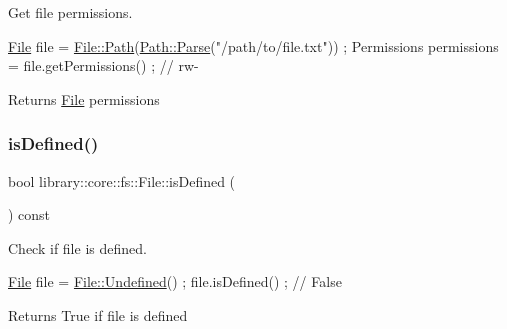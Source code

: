 Get file permissions. 


\begin{DoxyCode}
\hyperlink{classlibrary_1_1core_1_1fs_1_1File_a7490060f19a21d4ee58bb6cec87a1ca6}{File} file = \hyperlink{classlibrary_1_1core_1_1fs_1_1File_a0e0d8a8becb3cdd21775554e181452d8}{File::Path}(\hyperlink{classlibrary_1_1core_1_1fs_1_1Path_aebf5bd3af83e0b7376616e146f3e55df}{Path::Parse}(\textcolor{stringliteral}{"/path/to/file.txt"})) ;
Permissions permissions = file.getPermissions() ; \textcolor{comment}{// rw-}
\end{DoxyCode}


\begin{DoxyReturn}{Returns}
\hyperlink{classlibrary_1_1core_1_1fs_1_1File}{File} permissions 
\end{DoxyReturn}
\mbox{\label{classlibrary_1_1core_1_1fs_1_1File_a2044eecd956aaf55b4c55872485e1bf9}} 
\subsubsection{\texorpdfstring{is\+Defined()}{isDefined()}}
{\footnotesize\ttfamily bool library\+::core\+::fs\+::\+File\+::is\+Defined (\begin{DoxyParamCaption}{ }\end{DoxyParamCaption}) const}



Check if file is defined. 


\begin{DoxyCode}
\hyperlink{classlibrary_1_1core_1_1fs_1_1File_a7490060f19a21d4ee58bb6cec87a1ca6}{File} file = \hyperlink{classlibrary_1_1core_1_1fs_1_1File_a985adb1a33b94dcdbed2792651eb81af}{File::Undefined}() ;
file.isDefined() ; \textcolor{comment}{// False}
\end{DoxyCode}


\begin{DoxyReturn}{Returns}
True if file is defined 
\end{DoxyReturn}
\mbox{\label{classlibrary_1_1core_1_1fs_1_1File_ac81efdfeb17ea50abe23d96f69bc15ae}} 
